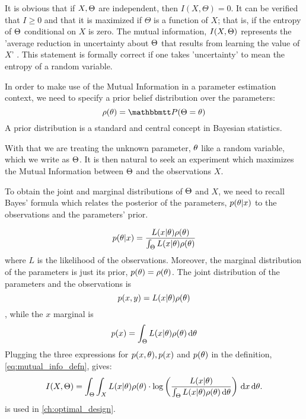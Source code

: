 It is obvious that if $X,{\Theta}$ are independent, then $I(X,\Theta) = 0$. It can
be verified that $I\geq0$ and that it is maximized if $\Theta$ is a function of
$X$; that is, if the entropy of ${\Theta}$ conditional on $X$ is zero. 
The mutual information, $I(X,{\Theta})$ represents the 'average
reduction in uncertainty about ${\Theta}$ that results from learning the value of
$X$' \cite{MacKay2003}. This statement is formally correct if one takes
 'uncertainty' to mean the entropy of a random
 variable.
 
In order to make use of the Mutual Information in a parameter estimation
context, we need to specify a prior belief distribution over the  parameters:   
$$
\rho(\th) = \Prob(\Theta = \th)
$$
A prior distribution is a standard and central concept in Bayesian statistics.
 
With that we are treating the unknown parameter, ${ \theta}$ like a random variable,
which we write as ${\Theta}$. It is then natural to seek an experiment which
maximizes the Mutual Information between ${\Theta}$ and the observations $X$.

To obtain the joint and marginal distributions of ${\Theta}$ and $X$, we
need to recall Bayes' formula which relates the posterior of the parameters,
$p({ \theta}|x)$ to the observations and the parameters' prior. 

\begin{equation}
p({ \theta}|x) = \frac{L(x|{ \theta})\rho({ \theta})}{\int_{\Theta} L(x|{ \theta})\rho({ \theta})}
\label{eq:bayes_formula}
\end{equation}
where $L$ is the likelihood of the observations. Moreover, the marginal distribution of the parameters is just its prior,
$p({ \theta}) = \rho({ \theta})$. The joint distribution of the parameters and the
observations is $$p(x,y) = L(x|{ \theta})\rho({ \theta})$$, while the $x$ marginal is $$p(x) = \int_\Theta L(x|{ \theta})\rho({ \theta}) \, \mathrm{d} { \theta}$$
Plugging the three expressions for $p(x,{ \theta}), p(x)$ and $p({ \theta})$ in the
definition, \cref{eq:mutual_info_defn}, gives:
\begin{equation}
I(X,{\Theta}) = \int_\Theta \int_X L(x|{ \theta})\rho({ \theta}) \cdot 
\log \left( \frac{L(x|{ \theta}) }
				{\int_\Theta L(x|{ \theta})\rho({ \theta}) \, \mathrm{d} { \theta}  } \right)
\, \mathrm{d} x\, \mathrm{d} { \theta}.
\label{eq:mutual_info_posterior_vs_observations} 
\end{equation} 
  is used in
\cref{ch:optimal_design}.


